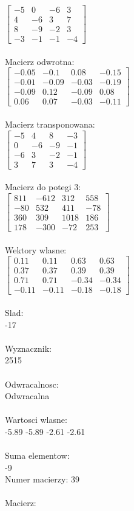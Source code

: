 \documentclass[a4paper,12pt]{article}
\begin{document}
$\begin{bmatrix} -5&0&-6&3\\4&-6&3&7\\8&-9&-2&3\\-3&-1&-1&-4 \end{bmatrix}$
\\
\\
Macierz odwrotna:\\

$\begin{bmatrix} -0.05&-0.1&0.08&-0.15\\-0.01&-0.09&-0.03&-0.19\\-0.09&0.12&-0.09&0.08\\0.06&0.07&-0.03&-0.11 \end{bmatrix}$
\\
\\
Macierz transponowana:\\

$\begin{bmatrix} -5&4&8&-3\\0&-6&-9&-1\\-6&3&-2&-1\\3&7&3&-4 \end{bmatrix}$
\\
\\
Macierz do potegi 3:\\

$\begin{bmatrix} 811&-612&312&558\\-80&532&411&-78\\360&309&1018&186\\178&-300&-72&253 \end{bmatrix}$
\\
\\
Wektory wlasne:\\

$\begin{bmatrix} 0.11&0.11&0.63&0.63\\0.37&0.37&0.39&0.39\\0.71&0.71&-0.34&-0.34\\-0.11&-0.11&-0.18&-0.18 \end{bmatrix}$
\\
\\
Slad:\\
-17
\\
\\
Wyznacznik:\\
2515
\\
\\
Odwracalnosc:\\
Odwracalna
\\
\\
Wartosci wlasne:\\
-5.89 -5.89 -2.61 -2.61
\\
\\
Suma elementow:\\
-9
\\
\newpage
Numer macierzy:
39
\\
\\
Macierz:\\
\end{document}
